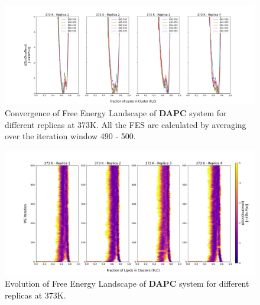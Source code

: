 \documentclass{biophys-new}
\begin{document}
\begin{figure}[hbt!]
\centering
\includegraphics[width=1.1\linewidth]{all_plots/ClusterLipids2Total/DPPC_DAPC_CHOL/373K/Convergence_DAPC_373_ClusterLipids2Total.png}
\caption{Convergence of Free Energy Landscape of \textbf{DAPC} system for different replicas at 373K. All the FES are calculated by averaging over the iteration window 490 - 500.}
\label{fig:view}

\end{figure}

\begin{figure}[hbt!]
\centering
\includegraphics[width=1.1\linewidth]{all_plots/ClusterLipids2Total/DPPC_DAPC_CHOL/373K/Evolution_DAPC_373_ClusterLipids2Total.png}
\caption{Evolution of Free Energy Landscape of \textbf{DAPC} system for different replicas at 373K.}
\label{fig:view}

\end{figure}
\end{document}
